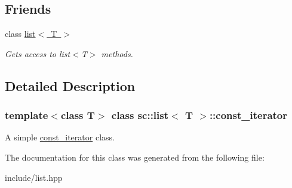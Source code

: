 \subsection*{Friends}
\begin{DoxyCompactItemize}
\item 
\mbox{\label{classsc_1_1list_1_1const__iterator_ab6cf03d50c50087700b0fb872accfa7b}} 
class \mbox{\hyperlink{classsc_1_1list_1_1const__iterator_ab6cf03d50c50087700b0fb872accfa7b}{list$<$ T $>$}}
\begin{DoxyCompactList}\small\item\em Get\textquotesingle{}s access to list$<$\+T$>$ methods. \end{DoxyCompactList}\end{DoxyCompactItemize}


\subsection{Detailed Description}
\subsubsection*{template$<$class T$>$\newline
class sc\+::list$<$ T $>$\+::const\+\_\+iterator}

A simple \mbox{\hyperlink{classsc_1_1list_1_1const__iterator}{const\+\_\+iterator}} class. 

The documentation for this class was generated from the following file\+:\begin{DoxyCompactItemize}
\item 
include/list.\+hpp\end{DoxyCompactItemize}

